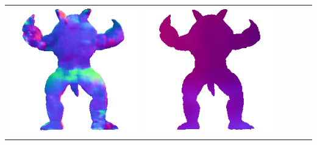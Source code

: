 \begin{center}
\begin{tabularx}{\linewidth}{@{}Y@{}Y@{}Y@{}Y@{}Y@{}Y@{}}
\includegraphics[width=\linewidth]{semisynthetic/20160617_22_marrnet_out.png} &
\includegraphics[width=\linewidth]{semisynthetic/20160617_22_ef_out.png} \\

\end{tabularx}
\end{center}
